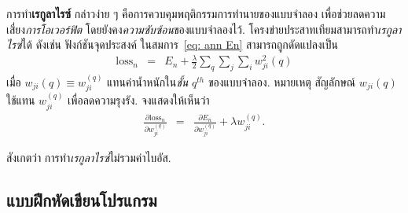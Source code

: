 \begin{Exercise}
\label{ex: ann regularization}

การทำ\textbf{เรกูลาไรซ์} กล่าวง่าย ๆ คือการควบคุมพฤติกรรมการทำนายของแบบจำลอง
เพื่อช่วยลดความเสี่ยง\textit{การโอเวอร์ฟิต} โดยยังคง\textit{ความซับซ้อน}ของแบบจำลองไว้.
โครงข่ายประสาทเทียมสามารถทำ\textit{เรกูลาไรซ์}ได้ ดังเช่น
ฟังก์ชันจุดประสงค์ ในสมการ~\ref{eq: ann En}
สามารถถูกดัดแปลงเป็น
\begin{eqnarray}
\mathrm{loss}_n &=& E_n + \frac{\lambda}{2} \sum_q \sum_j \sum_i  w_{ji}^2(q)
\label{eq: ann regularized En}   
\end{eqnarray}
เมื่อ $w_{ji}(q) \equiv w_{ji}^{(q)}$ แทนค่าน้ำหนักใน\textit{ชั้น} $q^{th}$ ของแบบจำลอง.
หมายเหตุ สัญลักษณ์ $w_{ji}(q)$ ใช้แทน $w_{ji}^{(q)}$ เพื่อลดความรุงรัง.
จงแสดงให้เห็นว่า
\begin{eqnarray}
\frac{\partial \mathrm{loss}_n}{\partial w_{ji}^{(q)}} &=& \frac{\partial E_n}{\partial w_{ji}^{(q)}} + \lambda w_{ji}^{(q)}
\label{eq: ann regularized derivative}. 
\end{eqnarray}

สังเกตว่า
การทำ\textit{เรกูลาไรซ์}ไม่รวมค่าไบอัส.


\end{Exercise}

	
%	
	
%	


\subsection{แบบฝึกหัดเขียนโปรแกรม}

